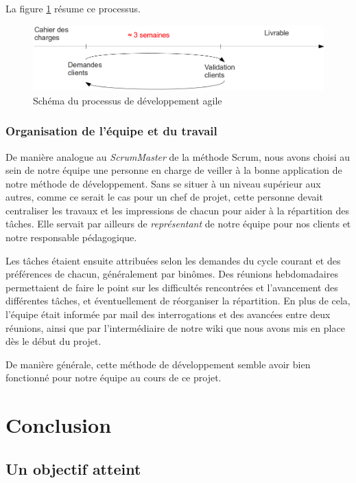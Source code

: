 \documentclass[a4paper,11pt]{article}
\begin{document}
La figure \ref{agile} résume ce processus.

\begin{figure}[H]
\begin{center}
\includegraphics[width=450px]{methode_agile.png}
\caption{Schéma du processus de développement agile}
\label{agile}
\end{center}
\end{figure}

\subsubsection{Organisation de l'équipe et du travail}

De manière analogue au \textit{ScrumMaster} de la méthode Scrum, nous avons choisi au sein de notre équipe une personne en charge de veiller à la bonne application de notre méthode de développement. Sans se situer à un niveau supérieur aux autres, comme ce serait le cas pour un chef de projet, cette personne devait centraliser les travaux et les impressions de chacun pour aider à la répartition des tâches. Elle servait par ailleurs de \textit{représentant} de notre équipe pour nos clients et notre responsable pédagogique.

Les tâches étaient ensuite attribuées selon les demandes du cycle courant et des préférences de chacun, généralement par binômes. Des réunions hebdomadaires permettaient de faire le point sur les difficultés rencontrées et l'avancement des différentes tâches, et éventuellement de réorganiser la répartition. En plus de cela, l'équipe était informée par mail des interrogations et des avancées entre deux réunions, ainsi que par l'intermédiaire de notre wiki que nous avons mis en place dès le début du projet.

De manière générale, cette méthode de développement semble avoir bien fonctionné pour notre équipe au cours de ce projet.

\clearpage

\section*{Conclusion}

\subsection*{Un objectif atteint}
\end{document}
